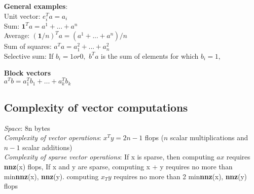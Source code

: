 \textbf{General examples}:\\
\textbullet Unit vector: $e_i^T a = a_i$ \\
\textbullet Sum: $\textbf{1}^T a = a^1 + ... + a^n$ \\
\textbullet Average: $(\textbf{1}/n)^T a=(a^1+...+a^n)/n$\\ 
\textbullet Sum of squares: $a^Ta = a^2_1 +...+a^2_n$\\
\textbullet Selective sum: If $b_i = 1 or 0,$ \textit{$b^Ta$} is the sum of elements for which $b_i = 1$,

\textbf{Block vectors}\\
$a^T b = a_1^T b_1 + ... + a_k^T b_k$

\subsection{Complexity of vector computations}
\textbullet \textit{Space}:  8n bytes\\
\textbullet \textit{Complexity of vector operations}: $x^Ty=2n-1$ flops ($n$ scalar multiplications and $n-1$ scalar additions)\\
\textbullet \textit{Complexity of sparse vector operations}: If x is sparse, then computing $ax$ requires \textbf{nnz}(x) flops, If x and y are sparse, computing x + y requires no more than min{\textbf{nnz}(x), \textbf{nnz}(y)}. computing $x_T y$ requires no more than 2 min{\textbf{nnz}(x), \textbf{nnz}(y)} flops
